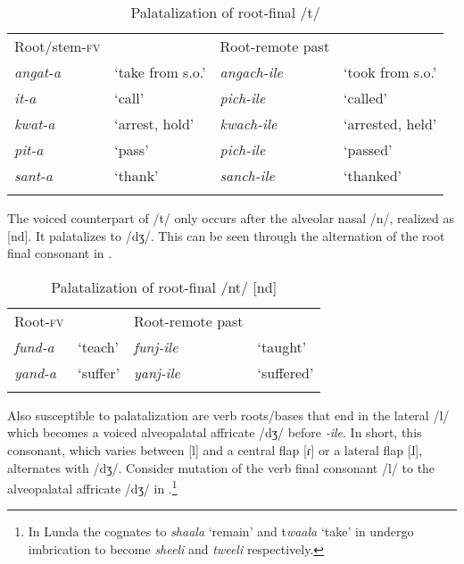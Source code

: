 \documentclass[output=paper]{langsci/langscibook}
\begin{document}
\begin{table}
\begin{tabular}{llll}
\lsptoprule
Root/stem-\textsc{fv} &  & Root-remote past & \\
\textit{angat-a} & `take from s.o.' & \textit{angach-ile} & `took from s.o.' \\
\textit{it-a} & `call' & \textit{pich-ile} & `called' \\
\textit{kwat-a} & `arrest, hold' & \textit{kwach-ile} & `arrested, held' \\
\textit{pit-a} & `pass' & \textit{pich-ile} & `passed' \\
\textit{sant-a} & `thank' & \textit{sanch-ile} & `thanked' \\

\lspbottomrule
\end{tabular}

\caption{Palatalization of root-final /t/}
\label{tab:10.kawasha}

 \end{table}




The voiced counterpart of /t/ only occurs after the alveolar nasal /n/, realized as [nd]. It palatalizes to /dʒ/. This can be seen through the alternation of the root final consonant in .

\begin{table}
\begin{tabular}{llll}
\lsptoprule
Root-\textsc{fv} &  & Root-remote past & \\
\textit{fund-a} & `teach' & \textit{funj-ile} & `taught' \\
\textit{yand-a} & `suffer' & \textit{yanj-ile} & `suffered' \\

\lspbottomrule
\end{tabular}

\caption{Palatalization of root-final /nt/ [nd]}
\label{tab:11.kawasha}

 \end{table}


Also susceptible to palatalization are verb roots/bases that end in the lateral /l/ which becomes a voiced alveopalatal affricate /dʒ/ before \textit{-ile}. In short, this consonant, which varies between [l] and a central flap [ɾ] or a lateral flap [ɺ], alternates with /dʒ/. Consider mutation of the verb final consonant /l/ to the alveopalatal affricate /dʒ/ in .\footnote{In Lunda the cognates to \textit{shaala} ‘remain’ and t\textit{waala }‘take’ in  undergo imbrication to become \textit{sheeli} and \textit{tweeli} respectively.}
\end{document}
